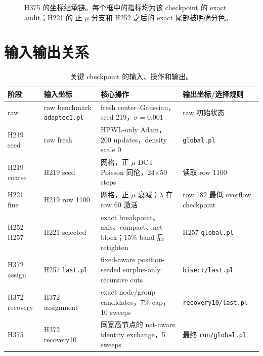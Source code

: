 \documentclass[UTF8,a4paper,11pt]{ctexrep}
\begin{document}
\begin{figure}[H]
\caption{H375 的坐标继承链。每个框中的指标均为该 checkpoint 的 exact audit；H221 的
正 $\mu$ 分支和 H252 之后的 exact 尾部被明确分色。}
\label{fig:flow}
\end{figure}

\section{输入输出关系}
\begin{table}[H]
\centering
\caption{关键 checkpoint 的输入、操作和输出。}
\label{tab:provenance}
\small
\begin{tabularx}{\textwidth}{>{\raggedright\arraybackslash}p{1.45cm} >{\raggedright\arraybackslash}p{3.55cm} >{\raggedright\arraybackslash}X >{\raggedright\arraybackslash}p{2.75cm}}
\toprule
阶段 & 输入坐标 & 核心操作 & 输出坐标/选择规则\\
\midrule
raw & raw benchmark \texttt{adaptec1.pl} & fresh center--Gaussian，seed 219，$\sigma=0.001$ & raw 初始状态\\
H219 seed & raw fresh & HPWL-only Adam，200 updates，density scale 0 & \texttt{global.pl}\\
H219 coarse & H219 seed & 128 网格，正 $\mu$ DCT Poisson 同伦，24$\times$50 steps & 读取 row 1100\\
H221 fine & H219 row 1100 & 512 网格，正 $\mu$ 衰减；$\lambda$ 在 row 60 激活 & row 182 最低 overflow checkpoint\\
H252--H257 & H221 selected & exact breakpoint、axis、compact、net-block；15\% band 后 retighten & H257 \texttt{global.pl}\\
H372 assign & H257 \texttt{last.pl} & fixed-aware position-seeded surplus-only recursive cuts & \texttt{bisect/last.pl}\\
H372 recovery & H372 assignment & exact node/group candidates，7\% cap，10 sweeps &
\texttt{recovery10/}\allowbreak\texttt{last.pl}\\
H375 & H372 recovery10 & 同宽高节点的 net-aware identity exchange，5 sweeps & 最终 \texttt{run/global.pl}\\
\bottomrule
\end{tabularx}
\end{table}
\end{document}
